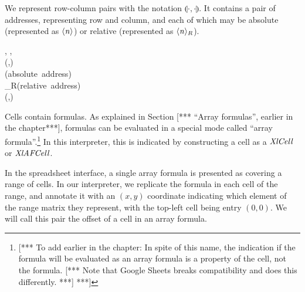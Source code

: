 We represent row-column pairs with the notation \ensuremath{\llparenthesis \cdot , \cdot \rrparenthesis }. It contains a pair
of addresses, representing row and column, and each of which may be absolute
(represented as \ensuremath{\langle \Varid{n}\rangle }) or relative (represented as \ensuremath{\langle \Varid{n}\rangle_{R}}).

\begin{hscode}\SaveRestoreHook
{}%
%
%
%
%
%
%
%
\>[B]{}\;\llparenthesis \cdot , \cdot \rrparenthesis \mathrel{=}\llparenthesis {}, \rrparenthesis {}\<[E]%
\\
\>[B]{}\<[4]%
\>[4]{}\;(,){}\<[E]%
\\[\blanklineskip]%
\>[B]{}\;\<[14]%
\>[14]{}\mathrel{=}{}\<[14E]%
\>[17]{}\langle {}\<[24]%
\>[24]{}\rangle {}\<[29]%
\>[29]{}\mbox{\onelinecomment  (absolute address)}{}\<[E]%
\\
\>[14]{}\mid {}\<[14E]%
\>[17]{}\langle {}\<[24]%
\>[24]{}\rangle_{R}{}\<[29]%
\>[29]{}\mbox{\onelinecomment  (relative address)}{}\<[E]%
\\
\>[B]{}\<[4]%
\>[4]{}\;(,){}\<[E]%
\ColumnHook
\end{hscode}\resethooks

Cells contain formulas. As explained in Section [*** ``Array formulas'', earlier
in the chapter***], formulas can be evaluated in a special mode called ``array
formula''.\footnote{[*** To add earlier in the chapter: In spite of this name,
the indication if the formula will be evaluated as an array formula is a
property of the cell, not the formula. [*** Note that Google Sheets breaks
compatibility and does this differently. ***] ***]} In this interpreter, this
is indicated by constructing a cell as a \ensuremath{\Conid{XlCell}} or \ensuremath{\Conid{XlAFCell}}.

In the spreadsheet interface, a single array formula is presented as covering
a range of cells. In our interpreter, we replicate the formula in each cell of
the range, and annotate it with an $(x, y)$ coordinate indicating which
element of the range matrix they represent, with the top-left cell being entry
$(0, 0)$. We will call this pair the offset of a cell in an array formula.

